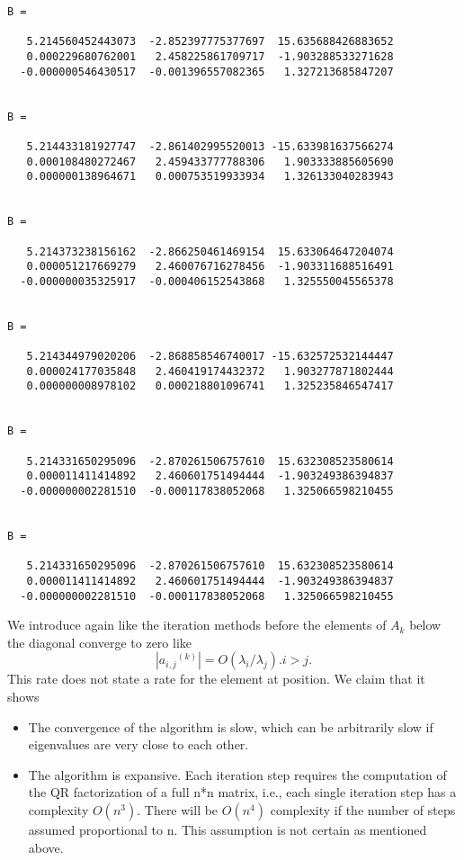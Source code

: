 \begin{verbatim}
B =

   5.214560452443073  -2.852397775377697  15.635688426883652
   0.000229680762001   2.458225861709717  -1.903288533271628
  -0.000000546430517  -0.001396557082365   1.327213685847207


B =

   5.214433181927747  -2.861402995520013 -15.633981637566274
   0.000108480272467   2.459433777788306   1.903333885605690
   0.000000138964671   0.000753519933934   1.326133040283943


B =

   5.214373238156162  -2.866250461469154  15.633064647204074
   0.000051217669279   2.460076716278456  -1.903311688516491
  -0.000000035325917  -0.000406152543868   1.325550045565378


B =

   5.214344979020206  -2.868858546740017 -15.632572532144447
   0.000024177035848   2.460419174432372   1.903277871802444
   0.000000008978102   0.000218801096741   1.325235846547417


B =

   5.214331650295096  -2.870261506757610  15.632308523580614
   0.000011411414892   2.460601751494444  -1.903249386394837
  -0.000000002281510  -0.000117838052068   1.325066598210455


B =

   5.214331650295096  -2.870261506757610  15.632308523580614
   0.000011411414892   2.460601751494444  -1.903249386394837
  -0.000000002281510  -0.000117838052068   1.325066598210455
\end{verbatim}

We introduce again like the iteration methods before the elements of $A_k$ below the diagonal converge to zero like 
\begin{equation}
    |{a_{i,j}}^{(k)}| = O (\lambda_i/\lambda_j). i>j.
\end{equation}
\label{convergence demostration}
This rate does not state a rate for the element at position. We claim that it shows
\begin{itemize}
    \item The convergence of the algorithm is slow, which can be arbitrarily slow if eigenvalues are very close to each other.
    \item The algorithm is expansive. Each iteration step requires the computation of the QR factorization of a full n*n matrix, i.e., each single iteration step has a complexity $O(n^3)$. There will be $O(n^4)$ complexity if the number of steps assumed proportional to n. This assumption is not certain as mentioned above.
\end{itemize}

